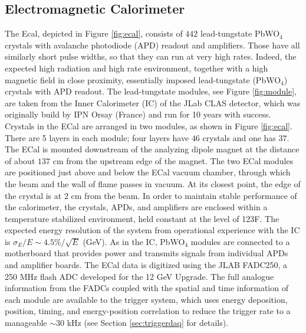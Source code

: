\subsection{Electromagnetic Calorimeter} 
\label{sec:ecal}

The Ecal, depicted in Figure \ref{fig:ecal}, consists of $442$ lead-tungstate PbWO$_4$ crystals with avalanche photodiode (APD) readout and amplifiers. Those have all similarly short pulse widths, so that they can run at very high rates. Indeed, the expected high radiation and high rate environment, together with a high magnetic field in close proximity, essentially imposed lead-tungstate (PbWO$_4$) crystals with APD readout. The lead-tungstate modules, see Figure \ref{fig:module}, are taken from the Inner Calorimeter (IC) of the JLab CLAS detector, which was originally build by IPN Orsay (France) and run for 10 years with success. Crystals in the ECal are arranged in two modules, as shown in Figure \ref{fig:ecal}. There are 5 layers in each module; four layers have $46$ crystals and one has $37$. The ECal is mounted downstream of the analyzing dipole magnet at the distance of about $137$ cm from the upstream edge of the magnet. The two ECal modules are positioned just above and below the ECal vacuum chamber, through which the beam and the wall of flame passes in vacuum. At its closest point, the edge of the crystal is at $2$ cm from the beam. In order to maintain stable performance of the calorimeter, the crystals, APDs, and amplifiers are enclosed within a temperature stabilized environment, held constant at the level of 1\!\char23F. The expected energy resolution of the system from operational experience with the IC is $\sigma_E/E \sim 4.5\%/\sqrt{E}$ (GeV). As in the IC, PbWO$_4$ modules are connected to a motherboard that provides power and transmits signals from individual APDs and amplifier boards. The ECal data is digitized using the JLAB FADC250, a 250 MHz flash ADC developed for the 12 GeV Upgrade. The full analogue information from the FADCs coupled with the spatial and time information of each module are available to the trigger system, which uses energy deposition, position, timing, and energy-position correlation to reduce the trigger rate to a manageable $\sim 30$ kHz (see Section \ref{sec:triggerdaq} for details).

